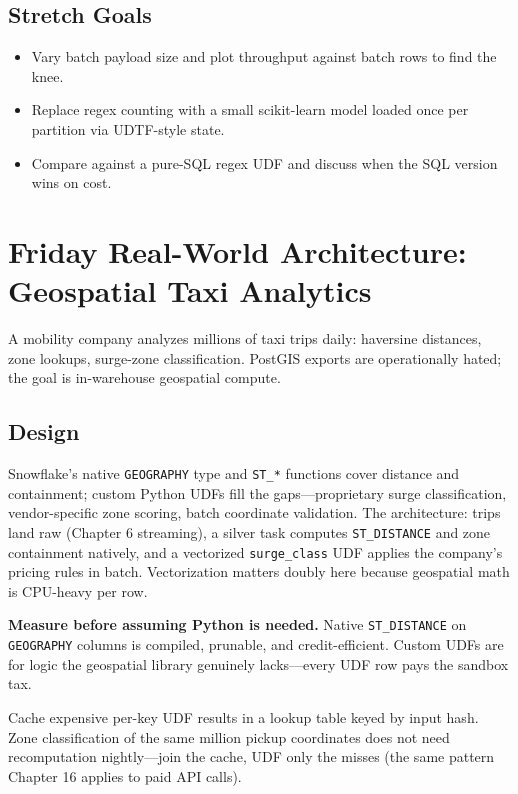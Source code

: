 \subsection*{Stretch Goals}
\begin{itemize}
    \item Vary batch payload size and plot throughput against batch rows to find the knee.
    \item Replace regex counting with a small scikit-learn model loaded once per partition via UDTF-style state.
    \item Compare against a pure-SQL regex UDF and discuss when the SQL version wins on cost.
\end{itemize}

\section{Friday Real-World Architecture: Geospatial Taxi Analytics}
A mobility company analyzes millions of taxi trips daily: haversine distances, zone lookups, surge-zone classification. PostGIS exports are operationally hated; the goal is in-warehouse geospatial compute.

\subsection{Design}
Snowflake's native \texttt{GEOGRAPHY} type and \texttt{ST\_*} functions cover distance and containment; custom Python UDFs fill the gaps---proprietary surge classification, vendor-specific zone scoring, batch coordinate validation. The architecture: trips land raw (Chapter 6 streaming), a silver task computes \texttt{ST\_DISTANCE} and zone containment natively, and a vectorized \texttt{surge\_class} UDF applies the company's pricing rules in batch. Vectorization matters doubly here because geospatial math is CPU-heavy per row.

\begin{pitfall}
\textbf{Measure before assuming Python is needed.} Native \texttt{ST\_DISTANCE} on \texttt{GEOGRAPHY} columns is compiled, prunable, and credit-efficient. Custom UDFs are for logic the geospatial library genuinely lacks---every UDF row pays the sandbox tax.
\end{pitfall}

\begin{tipbox}
Cache expensive per-key UDF results in a lookup table keyed by input hash. Zone classification of the same million pickup coordinates does not need recomputation nightly---join the cache, UDF only the misses (the same pattern Chapter 16 applies to paid API calls).
\end{tipbox}

